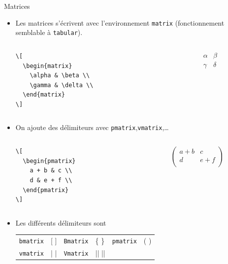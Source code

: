 \begin{frame}[fragile]{Matrices}
  \begin{itemize}
    \item Les matrices s'écrivent avec l'environnement \lstinline|matrix| (fonctionnement semblable à \lstinline|tabular|).
      \begin{columns}
        \begin{column}{0.45\textwidth}
          \begin{lstlisting}[style=nonumbers]
\[
  \begin{matrix}
    \alpha & \beta \\
    \gamma & \delta \\
  \end{matrix}
\]
          \end{lstlisting}
        \end{column}
        \begin{column}{0.45\textwidth}
          \[\begin{matrix}
            \alpha & \beta \\
            \gamma & \delta \\
            \end{matrix}\]
        \end{column}
      \end{columns}
    \item On ajoute des délimiteurs avec \lstinline|pmatrix|,\lstinline|vmatrix|,\ldots{}
      \begin{columns}
        \begin{column}{0.45\textwidth}
          \begin{lstlisting}[style=nonumbers]
\[
  \begin{pmatrix}
    a + b & c \\
    d & e + f \\
  \end{pmatrix}
\]
          \end{lstlisting}
        \end{column}
        \begin{column}{0.45\textwidth}
          \[\begin{pmatrix}
            a + b & c \\
            d & e + f \\
            \end{pmatrix}\]
        \end{column}
      \end{columns}
    \item Les différents délimiteurs sont
      \begin{center}
        \begin{tabular}{llllll}
            \lstinline|bmatrix| & [ ] & \lstinline|Bmatrix| & \{ \} & \lstinline|pmatrix| & ( ) \\
            \lstinline|vmatrix| & | | &	\lstinline|Vmatrix| & || ||
        \end{tabular}
      \end{center}
  \end{itemize}
\end{frame}

